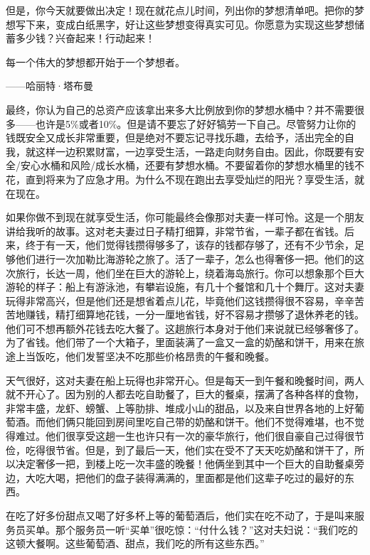但是，你今天就要做出决定！现在就花点儿时间，列出你的梦想清单吧。把你的梦想写下来，变成白纸黑字，好让这些梦想变得真实可见。你愿意为实现这些梦想储蓄多少钱？兴奋起来！行动起来！

\begin{BookQuote}
每一个伟大的梦想都开始于一个梦想者。

\hfill ——哈丽特·塔布曼
\end{BookQuote}

最终，你认为自己的总资产应该拿出来多大比例放到你的梦想水桶中？并不需要很多——也许是5\%或者10\%。但是请不要忘了好好犒劳一下自己。尽管努力让你的钱既安全又成长非常重要，但是绝对不要忘记寻找乐趣，去给予，活出完全的自我，就这样一边积累财富，一边享受生活，一路走向财务自由。因此，你既要有安全/安心水桶和风险/成长水桶，还要有梦想水桶。不要留着你的梦想水桶里的钱不花，直到将来为了应急才用。为什么不现在跑出去享受灿烂的阳光？享受生活，就在现在。

如果你做不到现在就享受生活，你可能最终会像那对夫妻一样可怜。这是一个朋友讲给我听的故事。这对老夫妻过日子精打细算，非常节省，一辈子都在省钱。后来，终于有一天，他们觉得钱攒得够多了，该存的钱都存够了，还有不少节余，足够他们进行一次加勒比海游轮之旅了。活了一辈子，怎么也得奢侈一把。他们的这次旅行，长达一周，他们坐在巨大的游轮上，绕着海岛旅行。你可以想象那个巨大游轮的样子：船上有游泳池，有攀岩设施，有几十个餐馆和几十个舞厅。这对夫妻玩得非常高兴，但是他们还是想省着点儿花，毕竟他们这钱攒得很不容易，辛辛苦苦地赚钱，精打细算地花钱，一分一厘地省钱，好不容易才攒够了退休养老的钱。他们可不想再额外花钱去吃大餐了。这趟旅行本身对于他们来说就已经够奢侈了。为了省钱。他们带了一个大箱子，里面装满了一盒又一盒的奶酪和饼干，用来在旅途上当饭吃，他们发誓坚决不吃那些价格昂贵的午餐和晚餐。

天气很好，这对夫妻在船上玩得也非常开心。但是每天一到午餐和晚餐时间，两人就不开心了。因为别的人都去吃自助餐了，巨大的餐桌，摆满了各种各样的食物，非常丰盛，龙虾、螃蟹、上等肋排、堆成小山的甜品，以及来自世界各地的上好葡萄酒。而他们俩只能回到房间里吃自己带的奶酪和饼干。他们不觉得难堪，也不觉得难过。他们很享受这趟一生也许只有一次的豪华旅行，他们很自豪自己过得很节俭，吃得很节省。但是，到了最后一天，他们实在受不了天天吃奶酪和饼干了，所以决定奢侈一把，到楼上吃一次丰盛的晚餐！他俩坐到其中一个巨大的自助餐桌旁边，大吃大喝，把他们的盘子装得满满的，里面都是他们这辈子吃过的最好的东西。

在吃了好多份甜点又喝了好多杯上等的葡萄酒后，他们实在吃不动了，于是叫来服务员买单。那个服务员一听“买单”很吃惊：“付什么钱？”这对夫妇说：“我们吃的这顿大餐啊。这些葡萄酒、甜点，我们吃的所有这些东西。”

